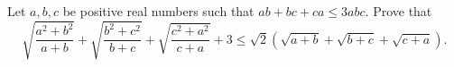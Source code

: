 Let $a,b,c$ be positive real numbers such that $ab+bc+ca \leq 3abc$. Prove that
\[
\sqrt{\frac{a^2+b^2}{a+b}}+\sqrt{\frac{b^2+c^2}{b+c}}+\sqrt{\frac{c^2+a^2}{c+a}}+3 \leq \sqrt{2}\left(\sqrt{a+b}+\sqrt{b+c}+\sqrt{c+a}\right).
\]
